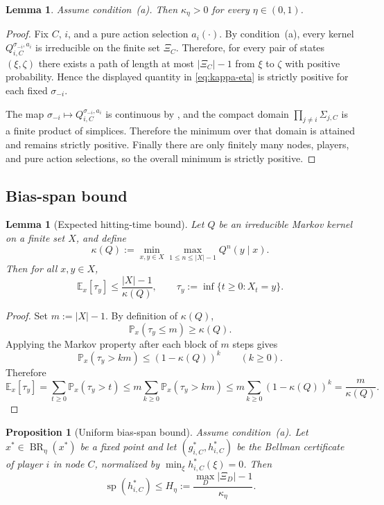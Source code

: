 \documentclass[12pt]{article}
\newtheorem{proposition}[theorem]{Proposition}
\newtheorem{lemma}[theorem]{Lemma}
\theoremstyle{definition}
\newcommand{\E}{\mathbb{E}}
\newcommand{\Pb}{\mathbb{P}}
\newcommand{\1}{\mathbf{1}}
\DeclareMathOperator{\spn}{sp}
\DeclareMathOperator{\BR}{BR}
\begin{document}
\begin{lemma}
\label{lem:kappa-positive}
Assume condition~\textnormal{(a)}.  Then $\kappa_\eta>0$ for every $\eta\in(0,1)$.
\end{lemma}

\begin{proof}
Fix $C$, $i$, and a pure action selection $a_i(\cdot)$.  By
condition~\textnormal{(a)}, every kernel
$Q_{i,C}^{\sigma_{-i},a_i}$ is irreducible on the finite set $\Xi_C$.  Therefore,
for every pair of states $(\xi,\zeta)$ there exists a path of length at most
$|\Xi_C|-1$ from $\xi$ to $\zeta$ with positive probability.  Hence the displayed
quantity in \eqref{eq:kappa-eta} is strictly positive for each fixed
$\sigma_{-i}$.

The map $\sigma_{-i}\mapsto Q_{i,C}^{\sigma_{-i},a_i}$ is continuous by
, and the compact domain
$\prod_{j\ne i}\Sigma_{j,C}$ is a finite product of simplices.  Therefore the
minimum over that domain is attained and remains strictly positive.  Finally there
are only finitely many nodes, players, and pure action selections, so the overall
minimum is strictly positive.
\end{proof}

\subsection{Bias-span bound}

\begin{lemma}[Expected hitting-time bound]
\label{lem:hitting-time}
Let $Q$ be an irreducible Markov kernel on a finite set $X$, and define
\[
\kappa(Q):=\min_{x,y\in X}\max_{1\le n\le |X|-1}Q^n(y\mid x).
\]
Then for all $x,y\in X$,
\[
\E_x[\tau_y]\le \frac{|X|-1}{\kappa(Q)},
\qquad
\tau_y:=\inf\{t\ge 0:X_t=y\}.
\]
\end{lemma}

\begin{proof}
Set $m:=|X|-1$.  By definition of $\kappa(Q)$,
\[
\Pb_x(\tau_y\le m)\ge \kappa(Q).
\]
Applying the Markov property after each block of $m$ steps gives
\[
\Pb_x(\tau_y>km)\le (1-\kappa(Q))^k
\qquad (k\ge 0).
\]
Therefore
\[
\E_x[\tau_y]
=
\sum_{t\ge 0}\Pb_x(\tau_y>t)
\le
m\sum_{k\ge 0}\Pb_x(\tau_y>km)
\le
m\sum_{k\ge 0}(1-\kappa(Q))^k
=
\frac{m}{\kappa(Q)}.
\]
\end{proof}

\begin{proposition}[Uniform bias-span bound]
\label{prop:bias-span}
Assume condition~\textnormal{(a)}.  Let $x^*\in\BR_\eta(x^*)$ be a fixed point and
let $(g_{i,C}^*,h_{i,C}^*)$ be the Bellman certificate of player $i$ in node $C$,
normalized by $\min_\xi h_{i,C}^*(\xi)=0$.  Then
\[
\spn(h_{i,C}^*)\le H_\eta:=\frac{\max_D|\Xi_D|-1}{\kappa_\eta}.
\]
\end{proposition}
\end{document}
